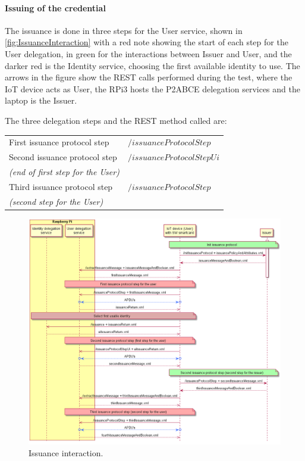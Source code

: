 \paragraph{Issuing of the credential}\hfil

The issuance is done in three steps for the User service, shown in \autoref{fig:IssuanceInteraction} with a red note showing the start of each step for the User delegation, in green for the interactions between Issuer and User, and the darker red is the Identity service, choosing the first available identity to use. The arrows in the figure show the REST calls performed during the test, where the IoT device acts as User, the RPi3 hosts the P2ABCE delegation services and the laptop is the Issuer.

The three delegation steps and the REST method called are:

\begin{center}
	\begin{tabular}{l|l}
	First issuance protocol step & $/issuanceProtocolStep$ \\
	Second issuance protocol step  & $/issuanceProtocolStepUi$ \\
	\textit{(end of first step for the User)} & \\
	Third issuance protocol step & $/issuanceProtocolStep$ \\
	\textit{(second step for the User)}  & \\
\end{tabular}
\end{center}


\begin{figure}[bth]
	\begin{center}
		\includegraphics[width=\linewidth]{gfx/UML/IssuanceInteraction}
	\end{center}
	\caption{Issuance interaction.}
	\label{fig:IssuanceInteraction}
\end{figure}



